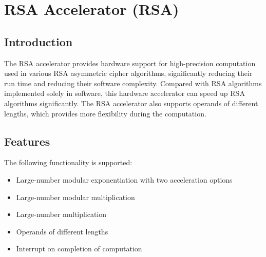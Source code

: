 \documentclass[main\_\_EN.tex]{subfiles}
\begin{document}

\ifglobal
\else
    \listoftodos
    {\let\clearpage\relax \listofdonetodos}
    \tableofcontents
\fi



\hypertarget{rsa}{}
\chapter{RSA Accelerator (RSA)}\label{mod:rsa}
\section{Introduction}

The RSA accelerator provides hardware support for high-precision computation used in various RSA asymmetric cipher algorithms, significantly reducing their run time and reducing their software complexity. Compared with RSA algorithms implemented solely in software, this hardware accelerator can speed up RSA algorithms significantly. The RSA accelerator also supports operands of different lengths, which provides more flexibility during the computation.
\section{Features}

The following functionality is supported:

\begin{itemize}
    \item Large-number modular exponentiation with two acceleration options
    \item Large-number modular multiplication
    \item Large-number multiplication
    \item Operands of different lengths
    \item Interrupt on completion of computation
\end{itemize}
\end{document}
